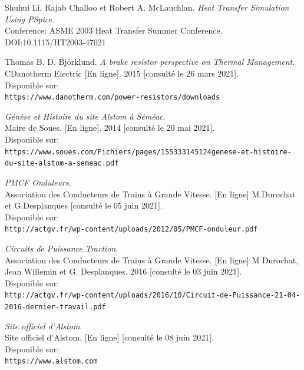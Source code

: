 \documentclass[a4paper]{report}
\begin{document}
	
	\renewcommand{\bibname}{Références} %
	\begin{thebibliography}{9}
		
		
		Shuhui Li, Rajab Challoo et Robert A. McLauchlan. 
		\textit{Heat Transfer Simulation Using PSpice}.\\ 
		Conference: ASME 2003 Heat Transfer Summer Conference.\\
		DOI:10.1115/HT2003-47021
		
		Thomas B. D. Björklund. 
		\textit{A brake resistor perspective on Thermal Management}.\\ 
		CDanotherm Electric [En ligne]. 2015 [consulté le 26 mars 2021].\\
		Disponible sur: \\\texttt{https://www.danotherm.com/power-resistors/downloads}
		
		\textit{Génèse et Histoire du site Alstom à Séméac}.\\
		Maire de Soues. [En ligne]. 2014 [consulté le 20 mai 2021].\\
		Disponible sur: \\\texttt{https://www.soues.com/Fichiers/pages/155333145124genese-et-histoire-du-site-alstom-a-semeac.pdf}
		
		\textit{PMCF Onduleurs}.\\
		Association des Conducteurs de Trains à Grande Vitesse. [En ligne] M.Durochat et G.Desplanques [consulté le 05 juin 2021].\\
		Disponible sur: \\\texttt{http://actgv.fr/wp-content/uploads/2012/05/PMCF-onduleur.pdf}
		
		\textit{Circuits de Puissance Traction}.\\
		Association des Conducteurs de Trains à Grande Vitesse. [En ligne] M Durochat, Jean Willemin et G. Desplanques, 2016 [consulté le 03 juin 2021].\\
		Disponible sur: \\\texttt{http://actgv.fr/wp-content/uploads/2016/10/Circuit-de-Puissance-21-04-2016-dernier-travail.pdf}
		
		\textit{Site officiel d'Alstom}.\\
		Site officiel d'Alstom. [En ligne] [consulté le 08 juin 2021].\\
		Disponible sur: \\\texttt{https://www.alstom.com}
		
	\end{thebibliography}
	
	
\end{document}

